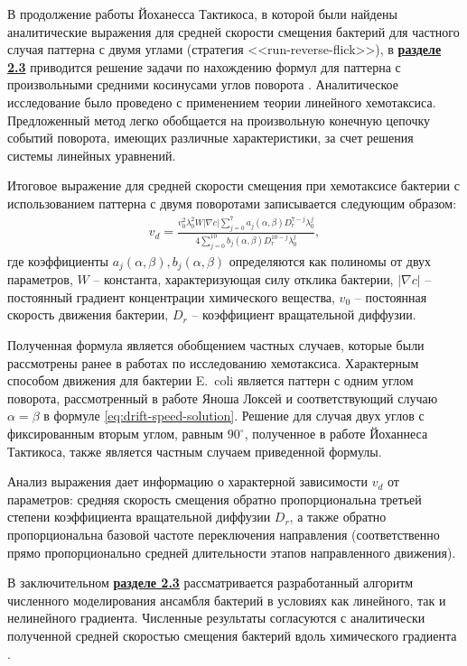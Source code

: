 В продолжение работы Йоханесса Тактикоса, в которой были найдены аналитические выражения для средней скорости смещения бактерий для частного случая паттерна с двумя углами (стратегия <<run-reverse-flick>>), в \underline{\textbf{разделе 2.3}} приводится решение задачи по нахождению формул для паттерна с произвольными средними косинусами углов поворота \cite{bib2}. Аналитическое исследование было проведено с применением теории линейного хемотаксиса. Предложенный метод легко обобщается на произвольную конечную цепочку событий поворота, имеющих различные характеристики, за счет решения системы линейных уравнений.

Итоговое выражение для средней скорости смещения при хемотаксисе бактерии с использованием паттерна с двумя поворотами записывается следующим образом:
\begin{equation}
    \begin{aligned}
        v_d=\frac{v_0^2\lambda_0^2W|\nabla c|\sum_{j=0}^{7} a_j(\alpha, \beta)D_r^{7-j}\lambda_0^j}{4\sum_{j=0}^{10}b_j(\alpha,\beta)D_r^{10-j}\lambda_0^j},
        \label{eq:drift-speed-solution}
    \end{aligned}
\end{equation}
где коэффициенты $a_j(\alpha,\beta), b_j(\alpha,\beta)$ определяются как полиномы от двух параметров, $W$ -- константа, характеризующая силу отклика бактерии, $|\nabla c|$ -- постоянный градиент концентрации химического вещества, $v_0$ -- постоянная скорость движения бактерии, $D_r$ -- коэффициент вращательной диффузии.

Полученная формула является обобщением частных случаев, которые были рассмотрены ранее в работах по исследованию хемотаксиса. Характерным способом движения для бактерии E.~coli является паттерн с одним углом поворота, рассмотренный в работе Яноша Локсей и соответствующий случаю $\alpha=\beta$ в формуле \cref{eq:drift-speed-solution}. Решение для случая двух углов с фиксированным вторым углом, равным $90^\circ$, полученное в работе Йоханнеса Тактикоса, также является частным случаем приведенной формулы.

Анализ выражения дает информацию о характерной зависимости $v_d$ от параметров: средняя скорость смещения обратно пропорциональна третьей степени коэффициента вращательной диффузии $D_r$, а также обратно пропорциональна базовой частоте переключения направления (соответственно прямо пропорционально средней длительности этапов направленного движения). 

В заключительном \underline{\textbf{разделе 2.3}} рассматривается разработанный алгоритм численного моделирования ансамбля бактерий в условиях как линейного, так и нелинейного градиента. Численные результаты согласуются с аналитически полученной средней скоростью смещения бактерий вдоль химического градиента \cite{confbib6}.




